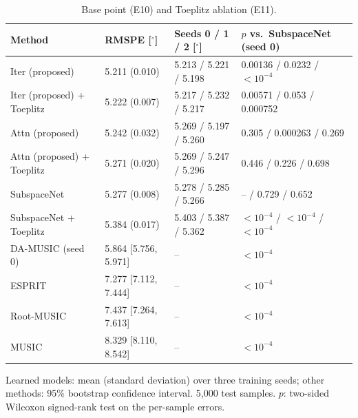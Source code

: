 \begin{table}[h!]
\centering
\small
\caption{Base point (E10) and Toeplitz ablation (E11).}
\label{tab:e10}
\begin{tabular}{llll}
\toprule
Method & RMSPE [$^\circ$] & Seeds 0 / 1 / 2 [$^\circ$] & $p$ vs.\ SubspaceNet (seed 0) \\
\midrule
Iter (proposed) & 5.211 (0.010) & 5.213 / 5.221 / 5.198 & 0.00136 / 0.0232 / $<10^{-4}$ \\
Iter (proposed) + Toeplitz & 5.222 (0.007) & 5.217 / 5.232 / 5.217 & 0.00571 / 0.053 / 0.000752 \\
Attn (proposed) & 5.242 (0.032) & 5.269 / 5.197 / 5.260 & 0.305 / 0.000263 / 0.269 \\
Attn (proposed) + Toeplitz & 5.271 (0.020) & 5.269 / 5.247 / 5.296 & 0.446 / 0.226 / 0.698 \\
SubspaceNet & 5.277 (0.008) & 5.278 / 5.285 / 5.266 & -- / 0.729 / 0.652 \\
SubspaceNet + Toeplitz & 5.384 (0.017) & 5.403 / 5.387 / 5.362 & $<10^{-4}$ / $<10^{-4}$ / $<10^{-4}$ \\
\midrule
DA-MUSIC (seed 0) & 5.864 [5.756, 5.971] & -- & $<10^{-4}$ \\
ESPRIT & 7.277 [7.112, 7.444] & -- & $<10^{-4}$ \\
Root-MUSIC & 7.437 [7.264, 7.613] & -- & $<10^{-4}$ \\
MUSIC & 8.329 [8.110, 8.542] & -- & $<10^{-4}$ \\
\hline
\end{tabular}
\par\smallskip\parbox{0.95\textwidth}{\footnotesize Learned models: mean (standard deviation) over three training seeds; other methods: 95\% bootstrap confidence interval. 5,000 test samples. $p$: two-sided Wilcoxon signed-rank test on the per-sample errors.}
\end{table}
